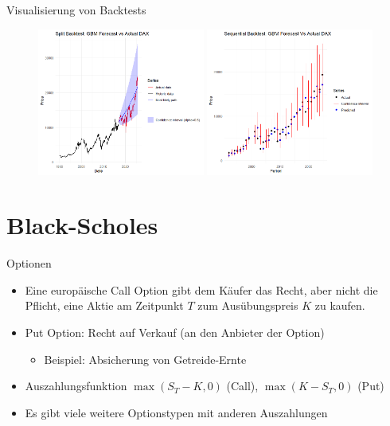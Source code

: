 \documentclass{beamer}
\begin{document}
\begin{frame}{Visualisierung von Backtests}
  \begin{figure}
    \centering
  \includegraphics[width=0.49\textwidth]{../thesis/images/dax_backtest.png}
  \includegraphics[width=0.49\textwidth]{../thesis/images/dax_backtest_seq.png}
  \end{figure}
\end{frame}

\section{Black-Scholes}

\begin{frame}{Optionen}
  \begin{itemize}
      \item Eine europäische Call Option gibt dem Käufer das Recht, aber nicht die Pflicht, eine Aktie am Zeitpunkt $T$ zum Ausübungspreis $K$ zu kaufen.
      \item Put Option: Recht auf Verkauf (an den Anbieter der Option)
      \begin{itemize}
        \item Beispiel: Absicherung von Getreide-Ernte
      \end{itemize} 
      \item Auszahlungsfunktion $\max(S_T-K,0)$ (Call), $\max(K-S_T, 0)$ (Put)
      \item Es gibt viele weitere Optionstypen mit anderen Auszahlungen
  \end{itemize}
\end{frame}
\end{document}
